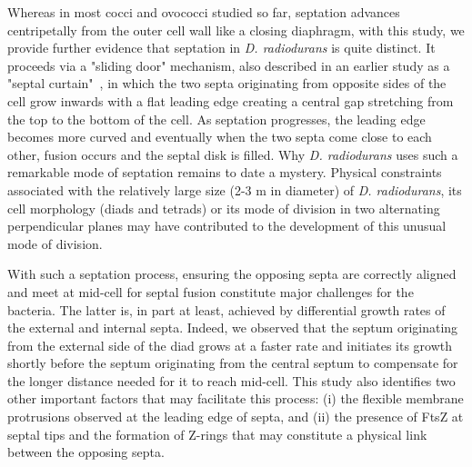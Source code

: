 Whereas in most cocci and ovococci studied so far, septation advances centripetally from the outer cell wall like a closing diaphragm, with this study, we provide further evidence that septation in \textit{D. radiodurans} is quite distinct.
It proceeds via a "sliding door" mechanism, also described in an earlier study as a "septal curtain"~\cite{murrayCellDivisionDeinococcus1983}, in which the two septa originating from opposite sides of the cell grow inwards with a flat leading edge creating a central gap stretching from the top to the bottom of the cell.
As septation progresses, the leading edge becomes more curved and eventually when the two septa come close to each other, fusion occurs and the septal disk is filled.
Why \textit{D. radiodurans} uses such a remarkable mode of septation remains to date a mystery.
Physical constraints associated with the relatively large size (2-3 \mu{}m in diameter) of \textit{D. radiodurans}, its cell morphology (diads and tetrads) or its mode of division in two alternating perpendicular planes may have contributed to the development of this unusual mode of division.

With such a septation process, ensuring the opposing septa are correctly aligned and meet at mid-cell for septal fusion constitute major challenges for the bacteria.
The latter is, in part at least, achieved by differential growth rates of the external and internal septa.
Indeed, we observed that the septum originating from the external side of the diad grows at a faster rate and initiates its growth shortly before the septum originating from the central septum to compensate for the longer distance needed for it to reach mid-cell.
This study also identifies two other important factors that may facilitate this process: (i) the flexible membrane protrusions observed at the leading edge of septa, and (ii) the presence of FtsZ at septal tips and the formation of Z-rings that may constitute a physical link between the opposing septa.

